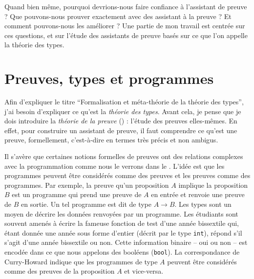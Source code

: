 Quand bien même, pourquoi devrions-nous faire confiance à l'assistant de
preuve ? Que pouvons-nous prouver exactement avec des assistant à la preuve ?
Et comment pouvons-nous les améliorer ?
Une partie de mon travail est centrée sur ces questions, et sur l'étude des
assistants de preuve basés sur ce que l'on appelle la théorie des types.

\section{Preuves, types et programmes}

Afin d'expliquer le titre ``Formalisation et méta-théorie de la théorie des
types'', j'ai besoin d'expliquer ce qu'est la \emph{théorie des types}.
Avant cela, je pense que je dois introduire la \emph{théorie de la preuve}
() : l'étude des preuves elles-mêmes.
En effet, pour construire un assistant de preuve, il faut comprendre ce qu'est
une preuve, formellement, c'est-à-dire en termes très précis et non ambigus.

Il s'avère que certaines notions formelles de preuves ont des relations complexes avec la programmation comme nous le verrons dans le .
L'idée est que les programmes peuvent être considérés comme des preuves et les
preuves comme des programmes.
Par exemple, la preuve qu'un proposition \(A\) implique la proposition \(B\)
est un programme qui prend une preuve de \(A\) en entrée et renvoie une preuve
de \(B\) en sortie.
Un tel programme est dit de type \(A \to B\). Les types sont un moyen de décrire
les données renvoyées par un programme. Les étudiants sont souvent amenés à
écrire la fameuse fonction de test d'une année bissextile qui, étant donnée une
année sous forme d'entier (décrit par le type \texttt{int}), répond
s'il s'agit d'une année bissextile ou non. Cette information binaire -- oui ou
non -- est encodée dans ce que nous appelons des booléens
(\texttt{bool}).
La correspondance de Curry-Howard indique que les programmes de type \(A\)
peuvent être considérés comme des preuves de la proposition \(A\) et vice-versa.


